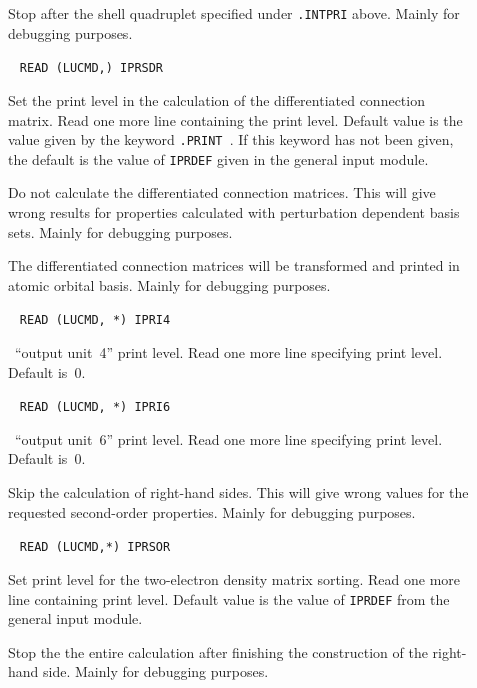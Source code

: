 \begin{description}
\item[] Stop after the shell quadruplet specified
under \verb|.INTPRI| above. Mainly for debugging purposes.

\item[]\verb| |\newline
\verb|READ (LUCMD,) IPRSDR|

Set the print level in the calculation of the differentiated connection
matrix. Read one more line containing the print level. Default
value is the value given by the keyword \verb|.PRINT |. If this
keyword has not been given, the default is the value of \verb|IPRDEF|
given in the general input module.

\item[] Do not calculate the differentiated connection
matrices. This will give wrong results for properties calculated with
perturbation dependent basis sets. Mainly for debugging purposes.

\item[] The differentiated connection matrices will be
transformed and printed in atomic orbital basis. Mainly for debugging
purposes.

\item[]\verb| |\newline
\verb|READ (LUCMD, *) IPRI4|

\sir\  ``output unit~4'' print level.  Read one more line specifying
print level. Default is~0.

\item[]\verb| |\newline
\verb|READ (LUCMD, *) IPRI6|

\sir\ ``output unit~6'' print level.  Read one more line specifying
print level. Default is~0.

\item[] Skip the calculation of right-hand sides. This
will give wrong values for the requested second-order properties.
Mainly for debugging purposes.

\item[]\verb| |\newline
\verb|READ (LUCMD,*) IPRSOR|

Set print level for the two-electron density matrix sorting. Read one
more line containing print level. Default value is the value of
\verb|IPRDEF| from the general input module. 

\item[] Stop the the entire calculation after finishing
the construction of the right-hand side. Mainly for debugging purposes.


\end{description}
